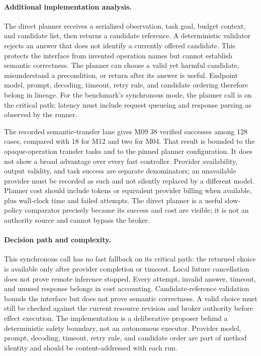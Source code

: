 \paragraph{Additional implementation analysis.} The direct planner receives a serialized observation, task goal, budget context, and candidate list, then returns a candidate reference. A deterministic validator rejects an answer that does not identify a currently offered candidate. This protects the interface from invented operation names but cannot establish semantic correctness. The planner can choose a valid yet harmful candidate, misunderstand a precondition, or return after its answer is useful. Endpoint model, prompt, decoding, timeout, retry rule, and candidate ordering therefore belong in lineage. For the benchmark's synchronous mode, the planner call is on the critical path; latency must include request queueing and response parsing as observed by the runner.

The recorded semantic-transfer lane gives M09 38 verified successes among 128 cases, compared with 18 for M12 and two for M04. That result is bounded to the opaque-operation transfer tasks and to the pinned planner configuration. It does not show a broad advantage over every fast controller. Provider availability, output validity, and task success are separate denominators; an unavailable provider must be recorded as such and not silently replaced by a different model. Planner cost should include tokens or equivalent provider billing when available, plus wall-clock time and failed attempts. The direct planner is a useful slow-policy comparator precisely because its success and cost are visible; it is not an authority source and cannot bypass the broker.


\paragraph{Decision path and complexity.} This synchronous call has no fast fallback on its critical path: the returned choice is available only after provider completion or timeout. Local future cancellation does not prove remote inference stopped. Every attempt, invalid answer, timeout, and unused response belongs in cost accounting. Candidate-reference validation bounds the interface but does not prove semantic correctness. A valid choice must still be checked against the current resource revision and broker authority before effect execution. The implementation is a deliberative proposer behind a deterministic safety boundary, not an autonomous executor. Provider model, prompt, decoding, timeout, retry rule, and candidate order are part of method identity and should be content-addressed with each run.


